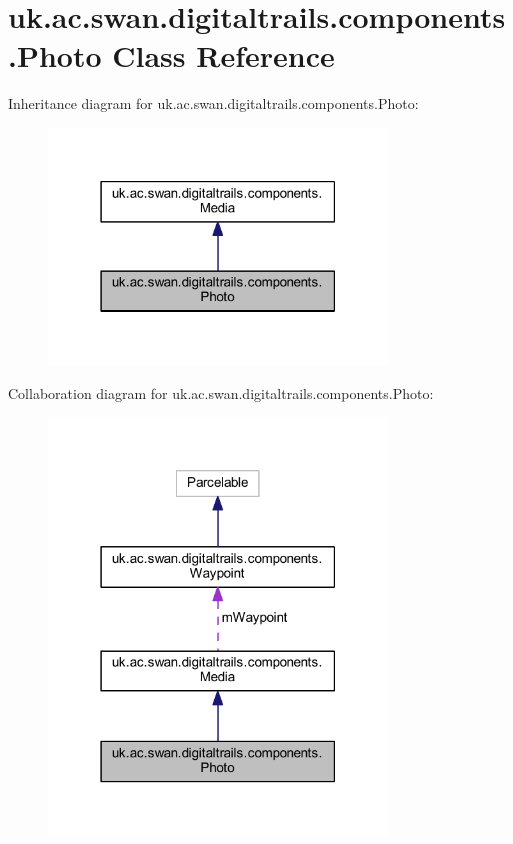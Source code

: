 \hypertarget{classuk_1_1ac_1_1swan_1_1digitaltrails_1_1components_1_1_photo}{\section{uk.\+ac.\+swan.\+digitaltrails.\+components.\+Photo Class Reference}
\label{classuk_1_1ac_1_1swan_1_1digitaltrails_1_1components_1_1_photo}
}


Inheritance diagram for uk.\+ac.\+swan.\+digitaltrails.\+components.\+Photo\+:\nopagebreak
\begin{figure}[H]
\begin{center}
\leavevmode
\includegraphics[width=255pt]{classuk_1_1ac_1_1swan_1_1digitaltrails_1_1components_1_1_photo__inherit__graph}
\end{center}
\end{figure}


Collaboration diagram for uk.\+ac.\+swan.\+digitaltrails.\+components.\+Photo\+:\nopagebreak
\begin{figure}[H]
\begin{center}
\leavevmode
\includegraphics[width=255pt]{classuk_1_1ac_1_1swan_1_1digitaltrails_1_1components_1_1_photo__coll__graph}
\end{center}
\end{figure}
